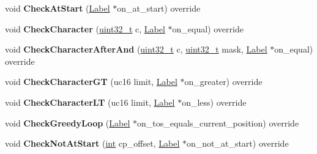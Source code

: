 \begin{DoxyCompactItemize}
void {\bfseries Check\+At\+Start} (\mbox{\hyperlink{classv8_1_1internal_1_1Label}{Label}} $\ast$on\+\_\+at\+\_\+start) override
\item 
\mbox{\label{classv8_1_1internal_1_1RegExpMacroAssemblerX64_aee1accc27396bd509eee054c76eaa0a2}} 
void {\bfseries Check\+Character} (\mbox{\hyperlink{classuint32__t}{uint32\+\_\+t}} c, \mbox{\hyperlink{classv8_1_1internal_1_1Label}{Label}} $\ast$on\+\_\+equal) override
\item 
\mbox{\label{classv8_1_1internal_1_1RegExpMacroAssemblerX64_abe588614d43f6725a5d47d9a03204ceb}} 
void {\bfseries Check\+Character\+After\+And} (\mbox{\hyperlink{classuint32__t}{uint32\+\_\+t}} c, \mbox{\hyperlink{classuint32__t}{uint32\+\_\+t}} mask, \mbox{\hyperlink{classv8_1_1internal_1_1Label}{Label}} $\ast$on\+\_\+equal) override
\item 
\mbox{\label{classv8_1_1internal_1_1RegExpMacroAssemblerX64_a7838a0ab22d678102de4165c416e7c52}} 
void {\bfseries Check\+Character\+GT} (uc16 limit, \mbox{\hyperlink{classv8_1_1internal_1_1Label}{Label}} $\ast$on\+\_\+greater) override
\item 
\mbox{\label{classv8_1_1internal_1_1RegExpMacroAssemblerX64_adbff5347a889b1ffca9c1bf57cac1ffe}} 
void {\bfseries Check\+Character\+LT} (uc16 limit, \mbox{\hyperlink{classv8_1_1internal_1_1Label}{Label}} $\ast$on\+\_\+less) override
\item 
\mbox{\label{classv8_1_1internal_1_1RegExpMacroAssemblerX64_ae013dbcb66044660ef20227904701987}} 
void {\bfseries Check\+Greedy\+Loop} (\mbox{\hyperlink{classv8_1_1internal_1_1Label}{Label}} $\ast$on\+\_\+tos\+\_\+equals\+\_\+current\+\_\+position) override
\item 
\mbox{\label{classv8_1_1internal_1_1RegExpMacroAssemblerX64_ae9416a73ce03a26775fef0e905f932e3}} 
void {\bfseries Check\+Not\+At\+Start} (\mbox{\hyperlink{classint}{int}} cp\+\_\+offset, \mbox{\hyperlink{classv8_1_1internal_1_1Label}{Label}} $\ast$on\+\_\+not\+\_\+at\+\_\+start) override
\item 

\end{DoxyCompactItemize}
